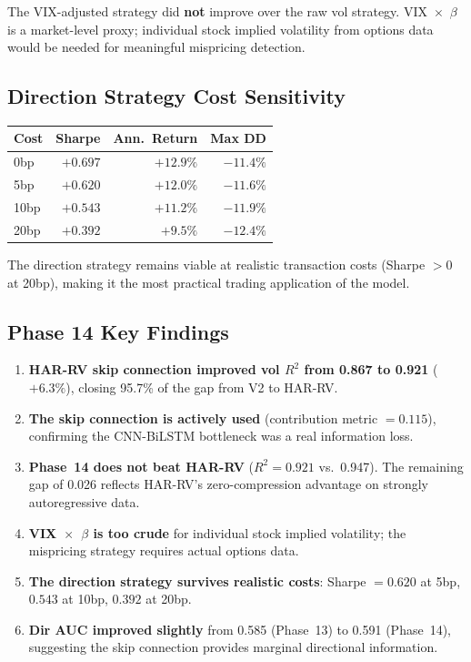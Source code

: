\documentclass[12pt,a4paper]{article}
\begin{document}
The VIX-adjusted strategy did \textbf{not} improve over the raw vol strategy.
VIX~$\times$~$\beta$ is a market-level proxy; individual stock implied
volatility from options data would be needed for meaningful mispricing detection.

\subsection{Direction Strategy Cost Sensitivity}

\begin{center}
\begin{tabular}{l r r r}
\hline
\textbf{Cost} & \textbf{Sharpe} & \textbf{Ann.\ Return} & \textbf{Max DD} \\
\hline
0bp  & $+0.697$ & $+12.9\%$ & $-11.4\%$ \\
5bp  & $+0.620$ & $+12.0\%$ & $-11.6\%$ \\
10bp & $+0.543$ & $+11.2\%$ & $-11.9\%$ \\
20bp & $+0.392$ & $+9.5\%$  & $-12.4\%$ \\
\hline
\end{tabular}
\end{center}

The direction strategy remains viable at realistic transaction costs (Sharpe
$> 0$ at 20bp), making it the most practical trading application of the model.

\subsection{Phase 14 Key Findings}

\begin{enumerate}
    \item \textbf{HAR-RV skip connection improved vol $R^2$ from 0.867 to
          0.921} ($+6.3\%$), closing 95.7\% of the gap from V2 to HAR-RV.
    \item \textbf{The skip connection is actively used} (contribution metric
          $= 0.115$), confirming the CNN-BiLSTM bottleneck was a real
          information loss.
    \item \textbf{Phase~14 does not beat HAR-RV} ($R^2 = 0.921$ vs.\ 0.947).
          The remaining gap of 0.026 reflects HAR-RV's zero-compression
          advantage on strongly autoregressive data.
    \item \textbf{VIX~$\times$~$\beta$ is too crude} for individual stock
          implied volatility; the mispricing strategy requires actual options
          data.
    \item \textbf{The direction strategy survives realistic costs}: Sharpe
          $= 0.620$ at 5bp, $0.543$ at 10bp, $0.392$ at 20bp.
    \item \textbf{Dir AUC improved slightly} from 0.585 (Phase~13) to 0.591
          (Phase~14), suggesting the skip connection provides marginal
          directional information.
\end{enumerate}
\end{document}
